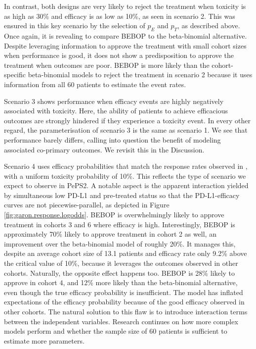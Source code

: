 \documentclass[alpha-refs]{wiley-article}
\begin{document}
In contrast, both designs are very likely to reject the treatment when toxicity is as high as 30\% and efficacy is as low as 10\%, as seen in scenario 2.
This was ensured in this key scenario by the selection of $p_E$ and $p_T$, as described above.
Once again, it is revealing to compare BEBOP to the beta-binomial alternative.
Despite leveraging information to approve the treatment with small cohort sizes when performance is good, it does not show a predisposition to approve the treatment when outcomes are poor.
BEBOP is more likely than the cohort-specific beta-binomial models to reject the treatment in scenario 2 because it uses information from all 60 patients to estimate the event rates.

Scenario 3 shows performance when efficacy events are highly negatively associated with toxicity.
Here, the ability of patients to achieve efficacious outcomes are strongly hindered if they experience a toxicity event.
In every other regard, the parameterisation of scenario 3 is the same as scenario 1.
We see that performance barely differs, calling into question the benefit of modeling associated co-primary outcomes.
We revisit this in the Discussion.

Scenario 4 uses efficacy probabilities that match the response rates observed in \cite{Garon2015}, with a uniform toxicity probability of 10\%.
This reflects the type of scenario we expect to observe in PePS2.
A notable aspect is the apparent interaction yielded by simultaneous low PD-L1 and pre-treated status so that the PD-L1-efficacy curves are not piecewise-parallel, as depicted in Figure \ref{fig:garon.response.logodds}.
BEBOP is overwhelmingly likely to approve treatment in cohorts 3 and 6 where efficacy is high.
Interestingly, BEBOP is approximately 70\% likely to approve treatment in cohort 2 as well, an improvement over the beta-binomial model of roughly 20\%.
It manages this, despite an average cohort size of 13.1 patients and efficacy rate only 9.2\% above the critical value of 10\%, because it leverages the outcomes observed in other cohorts.
Naturally, the opposite effect happens too.
BEBOP is 28\% likely to approve in cohort 4, and 12\% more likely than the beta-binomial alternative, even though the true efficacy probability is insufficient.
The model has inflated expectations of the efficacy probability because of the good efficacy observed in other cohorts.
The natural solution to this flaw is to introduce interaction terms between the independent variables.
Research continues on how more complex models perform and whether the sample size of 60 patients is sufficient to estimate more parameters.
\end{document}
